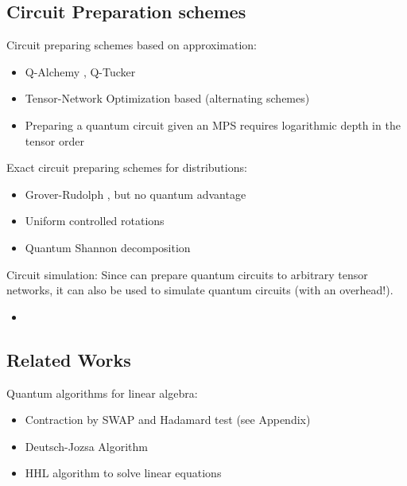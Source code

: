 \subsection{Circuit Preparation schemes}

Circuit preparing schemes based on approximation:
\begin{itemize}
    \item Q-Alchemy \cite{araujo_low-rank_2023}, Q-Tucker \cite{blank_tucker_2026}
    \item Tensor-Network Optimization based (alternating schemes) \cite{rudolph_synergistic_2023,rudolph_decomposition_2023}
    \item Preparing a quantum circuit given an MPS requires logarithmic depth in the tensor order \cite{malz_preparation_2024}
\end{itemize}

Exact circuit preparing schemes for distributions:
\begin{itemize}
    \item Grover-Rudolph \cite{grover_creating_2002}, but no quantum advantage \cite{herbert_no_2021}
    \item Uniform controlled rotations \cite{mottonen_transformation_2005}
    \item Quantum Shannon decomposition \cite{shende_synthesis_2006}
\end{itemize}

Circuit simulation:
Since \qcreason{} can prepare quantum circuits to arbitrary tensor networks, it can also be used to simulate quantum circuits (with an overhead!).
\begin{itemize}
    \item \cite{sander_large-scale_2025,sander_quantum_2025}
\end{itemize}

\subsection{Related Works}

Quantum algorithms for linear algebra:
\begin{itemize}
    \item Contraction by SWAP and Hadamard test (see Appendix)
    \item Deutsch-Jozsa Algorithm
    \item HHL algorithm to solve linear equations \cite{harrow_quantum_2009}
\end{itemize}